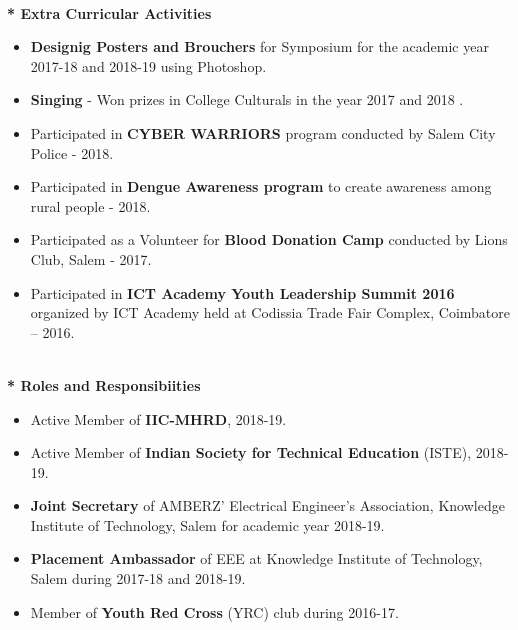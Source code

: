 \documentclass{article}
\begin{document}
\begin{flushleft}
\textbf{\\* Extra Curricular Activities}
\begin{itemize}
\item \textbf{Designig Posters and Brouchers} for Symposium for the academic year 2017-18 and 2018-19 using Photoshop.
\item \textbf{Singing} - Won prizes in College Culturals in the year 2017 and 2018 .
\item Participated in  \textbf{CYBER WARRIORS} program conducted by Salem City Police - 2018.
\item Participated in \textbf{Dengue Awareness program} to create awareness among rural people - 2018.
\item Participated as a Volunteer for \textbf{Blood Donation Camp} conducted by Lions Club, Salem - 2017.
\item Participated in \textbf{ICT Academy Youth Leadership Summit 2016} organized by ICT Academy held at Codissia Trade Fair Complex, Coimbatore – 2016.
\end{itemize}

\textbf{\\* Roles and Responsibiities}
\begin{itemize}
\item Active Member of \textbf{IIC-MHRD}, 2018-19.
\item Active Member of \textbf{Indian Society for Technical Education} (ISTE), 2018-19.
\item \textbf{Joint Secretary} of AMBERZ’ Electrical Engineer's Association, Knowledge Institute of Technology, Salem  for academic year 2018-19.
\item \textbf{Placement Ambassador} of EEE at Knowledge Institute of Technology, Salem during 2017-18 and 2018-19.
\item Member of \textbf{Youth Red Cross} (YRC) club during 2016-17.
\end{itemize}


\end{flushleft}
\end{document}
